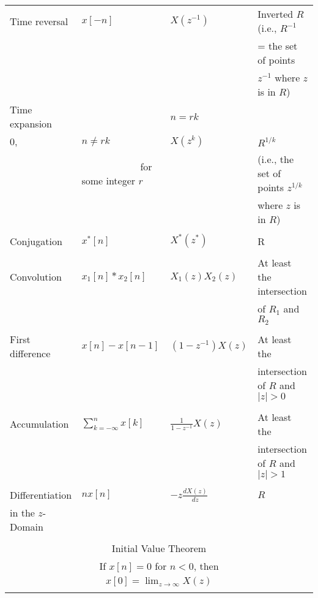 \documentclass[12pt]{article}
\numberwithin{equation}{section}
\begin{document}
\begin{table}[htbp]
\begin{center}
\begin{tabular}{llll}
Time reversal     & $ x[-n]$   & $ X(z^{-1}) $ & Inverted $R$ (i.e., $R^{-1}$ \\
                                   & & &  = the set of points \\
                       & & & $z^{-1}$ where $z$ is in $R$)\\
Time expansion  & \(\displaystyle
 x_{(k)}[n] =  \left\{
     \begin{array}{ll}
       x[r], & \mbox{$n = r k$}\\
       0,    & \mbox{$n \not= r k$}
     \end{array}
   \right.
\) & $  X(z^k) $  & $R^{1/k}$ \\
& ~~~~~~~~~~~~for some integer $r$ & & (i.e., the set of points $z^{1/k}$ \\
& & & where $z$ is in $R$)\\
\\
Conjugation  & $x^{\ast}[n]$ &$X^{\ast}(z^{\ast})$ & R \\ \\

Convolution  & $ x_1 [n] * x_2[n]$ & $ X_1(z)X_2(z) $ & At least the intersection\\
                 & & & of $R_1$ and $R_2$\\ \\
First difference & $x[n]-x[n-1] $ & $(1-z^{-1})X(z)$ & At least the\\
               & & & intersection of $ R$ and  $|z| > 0$ \\ \\
Accumulation & $ \sum_{k = - \infty}^n x[k]$ & $\frac{1}{1 - z^{-1}}X(z)$ & At least the\\
               & & & intersection of $ R$ and  $|z| > 1$ \\ \\
\label{prp:10.5.6}
Differentiation   & $ n x[n] $  & $ -z \frac{d X(z)}{d z} $ & $R$ \\
in the $z$-Domain & & & \\
& & & \\
\multicolumn{4}{c}{Initial Value Theorem} \\
\multicolumn{4}{c}{If $x[n]=0$ for $ n< 0$, then}\\
\multicolumn{4}{c}{$x[0]=\lim_{z\to\infty}X(z)$}
\\ \\ \hline
\end{tabular}
\end{center}
\end{table}
\clearpage
\end{document}
